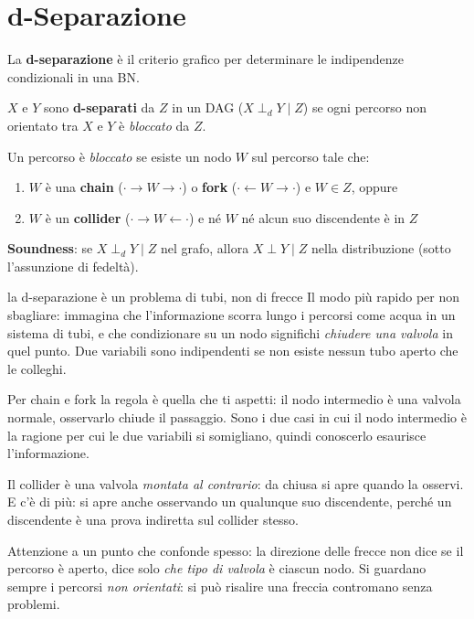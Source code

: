 \section{d-Separazione}

La \textbf{d-separazione} è il criterio grafico per determinare le indipendenze condizionali in una BN.

\begin{definition}
$X$ e $Y$ sono \textbf{d-separati} da $Z$ in un DAG ($X \perp_d Y \mid Z$) se ogni percorso non orientato tra $X$ e $Y$ è \emph{bloccato} da $Z$.

Un percorso è \emph{bloccato} se esiste un nodo $W$ sul percorso tale che:
\begin{enumerate}
    \item $W$ è una \textbf{chain} ($\cdot \to W \to \cdot$) o \textbf{fork} ($\cdot \leftarrow W \to \cdot$) e $W \in Z$, oppure
    \item $W$ è un \textbf{collider} ($\cdot \to W \leftarrow \cdot$) e né $W$ né alcun suo discendente è in $Z$
\end{enumerate}
\end{definition}

\textbf{Soundness}: se $X \perp_d Y \mid Z$ nel grafo, allora $X \perp Y \mid Z$ nella distribuzione (sotto l'assunzione di fedeltà).

\begin{intuizione}{la d-separazione è un problema di tubi, non di frecce}
Il modo più rapido per non sbagliare: immagina che l'informazione scorra lungo i percorsi come acqua in un sistema di tubi, e che condizionare su un nodo significhi \emph{chiudere una valvola} in quel punto. Due variabili sono indipendenti se non esiste nessun tubo aperto che le colleghi.

Per chain e fork la regola è quella che ti aspetti: il nodo intermedio è una valvola normale, osservarlo chiude il passaggio. Sono i due casi in cui il nodo intermedio è la ragione per cui le due variabili si somigliano, quindi conoscerlo esaurisce l'informazione.

Il collider è una valvola \emph{montata al contrario}: da chiusa si apre quando la osservi. E c'è di più: si apre anche osservando un qualunque suo discendente, perché un discendente è una prova indiretta sul collider stesso.

Attenzione a un punto che confonde spesso: la direzione delle frecce non dice se il percorso è aperto, dice solo \emph{che tipo di valvola} è ciascun nodo. Si guardano sempre i percorsi \emph{non orientati}: si può risalire una freccia contromano senza problemi.
\end{intuizione}

